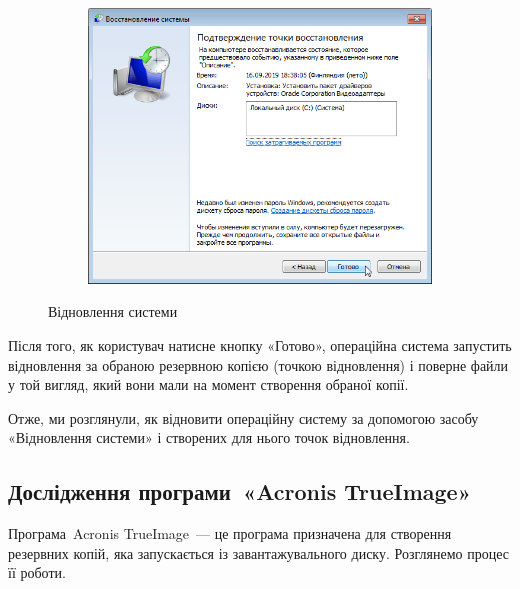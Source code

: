 \documentclass[
	a4paper,
	oneside,
	BCOR = 10mm,
	DIV = 12,
	12pt,
	headings = normal,
]{scrartcl}
\newlength{\gridunitwidth}
\begin{document}
\begin{figure}[!htbp]
					\begin{subfigure}[b]{5.5\gridunitwidth}
						\includegraphics[width=\columnwidth]{./assets/y04s01-infosec-lab-01-03-p18.png}
						\caption{}
						\label{subfig:04-sysrestore-01-03}
					\end{subfigure}
					\caption{Відновлення системи}
					\label{fig:04-sysrestore-01}
				\end{figure}

				Після того, як користувач натисне кнопку «Готово», операційна система запустить відновлення за обраною резервною копією (точкою відновлення) і поверне файли у той вигляд, який вони мали на момент створення обраної копії.

				Отже, ми розглянули, як відновити операційну систему за допомогою засобу «Відновлення системи» і створених для нього точок відновлення.

		\subsection{Дослідження програми~«\textenglish{Acronis TrueImage}»}
			Програма~\textenglish{Acronis TrueImage}~— це програма призначена для створення резервних копій, яка запускається із завантажувального диску. Розглянемо процес її роботи.
\end{document}
